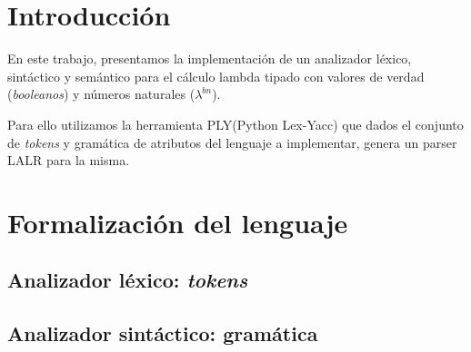 \documentclass[11pt]{article}
\begin{document}

\thispagestyle{empty}
\maketitle

\newpage
\newpage
\tableofcontents

\newpage


\section{Introducción}


En este trabajo, presentamos la implementación de un analizador léxico,
sintáctico y semántico para el cálculo lambda tipado con valores de verdad
(\emph{booleanos}) y números naturales ($\lambda^{bn}$).

Para ello utilizamos la herramienta \textsc{PLY}(Python Lex-Yacc) que dados
el conjunto de \emph{tokens} y gramática de atributos del lenguaje a implementar,
 genera un parser \textsc{LALR} para la misma.


\section{Formalización del lenguaje}



\subsection{Analizador léxico: \emph{tokens}}


\subsection{Analizador sintáctico: gramática}
\end{document}
